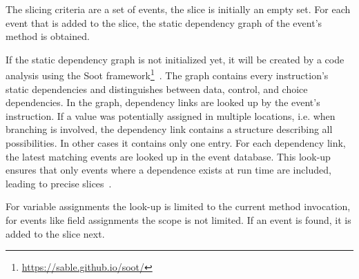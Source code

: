 \documentclass[
			english,
			]{elsarticle}
\begin{document}


The slicing criteria are a set of events, the slice is initially an empty set.
For each event that is added to the slice, the static dependency graph of the event's method is obtained.

If the static dependency graph is not initialized yet, it will be created by a code analysis using the Soot framework\footnote{\url{https://sable.github.io/soot/}}~\cite{lam_11_the_soot_framework}.
The graph contains every instruction's static dependencies and distinguishes between data, control, and choice dependencies.
In the graph, dependency links are looked up by the event's instruction. 
If a value was potentially assigned in multiple locations, i.e. when branching is involved, the dependency link contains a structure describing all possibilities.
In other cases it contains only one entry.
For each dependency link, the latest matching events are looked up in the event database.
This look-up ensures that only events where a dependence exists at run time are included, leading to precise slices~\cite{zhang_precise_2003}.

For variable assignments the look-up is limited to the current method invocation, for events like field assignments the scope is not limited.
If an event is found, it is added to the slice next.
\end{document}
